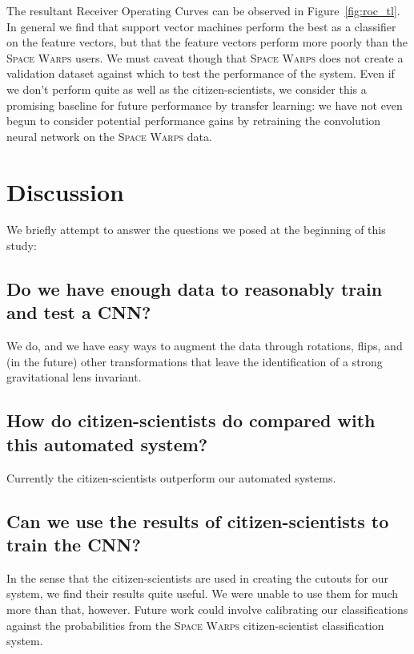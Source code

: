 \documentclass[10pt,twocolumn,letterpaper]{article}
\begin{document}
The resultant Receiver Operating Curves can be observed in
Figure~\ref{fig:roc_tl}. In general we find that support vector machines
perform the best as a classifier on the feature vectors, but that the feature
vectors perform more poorly than the \textsc{Space Warps} users. We must caveat
though that \textsc{Space Warps} does not create a validation dataset against
which to test the performance of the system. Even if we don't perform quite as
well as the citizen-scientists, we consider this a
promising baseline for future performance by transfer learning: we have not
even begun to consider potential performance gains by retraining the
convolution neural network on the \textsc{Space Warps} data.

\section{Discussion}

We briefly attempt to answer the questions we posed at the beginning of this
study:

\subsection*{Do we have enough data to reasonably train and test a CNN?}

We do, and we have easy ways to augment the data through rotations, flips, and
(in the future) other transformations that leave the identification of a strong
gravitational lens invariant.

\subsection*{How do citizen-scientists do compared with this automated system?}

Currently the citizen-scientists outperform our automated systems.

\subsection*{Can we use the results of citizen-scientists to train the CNN?}

In the sense that the citizen-scientists are used in creating the cutouts for
our system, we find their results quite useful. We were unable to use them for
much more than that, however. Future work could involve calibrating our
classifications against the probabilities from the \textsc{Space Warps}
citizen-scientist classification system.
\end{document}
